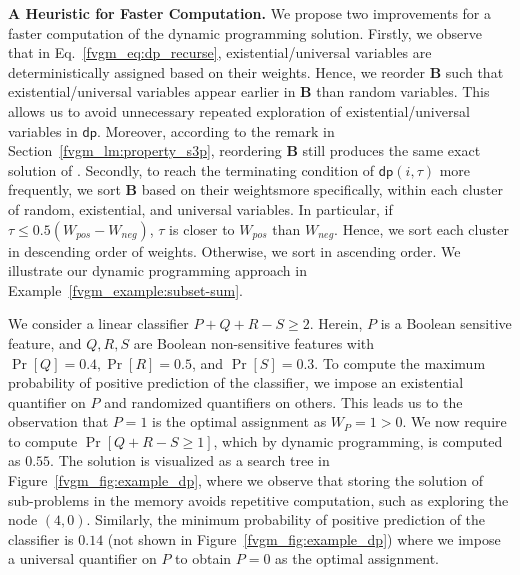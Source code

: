 \textbf{A Heuristic for Faster Computation.} 
We propose two improvements for a faster computation of the dynamic programming solution. Firstly, we observe that in Eq.~\eqref{fvgm_eq:dp_recurse}, existential/universal variables are deterministically  assigned based on their weights. Hence, we reorder $ \mathbf{B} $ such that existential/universal variables appear earlier in $ \mathbf{B} $ than random variables. This allows us to avoid unnecessary repeated exploration of existential/universal variables in $ \mathsf{dp} $. Moreover, according to the remark in Section~\ref{fvgm_lm:property_s3p}, reordering $ \mathbf{B} $ still produces the same exact solution of {\stochastic}. Secondly, to reach the terminating condition of $ \mathsf{dp}(i, \tau) $ more frequently, we sort $ \mathbf{B} $ based on their weights\textemdash more specifically, within each cluster of random, existential, and universal variables. In particular, if $ \tau \le 0.5(W_{pos} - W_{neg}) $, $ \tau $ is closer to $ W_{pos} $ than $ W_{neg} $. Hence, we sort each cluster in descending order of weights. Otherwise,  we sort in ascending order. We illustrate our dynamic programming approach in Example~\ref{fvgm_example:subset-sum}.
	
\begin{example}\label{fvgm_example:subset-sum}
\normalfont
We consider a linear classifier $ P + Q + R - S \ge 2$. Herein, $ P $ is a Boolean sensitive feature, and $ Q, R, S $ are Boolean non-sensitive features with $ \Pr[Q] = 0.4,  \Pr[R] = 0.5 $, and $ \Pr[S] = 0.3 $. To compute the maximum probability of positive prediction of the classifier,  we impose an existential quantifier on $P$ and randomized quantifiers on others. This leads us to the observation that $ P = 1 $ is the optimal assignment as $ W_P = 1 > 0 $. We now require to compute $ \Pr[Q + R - S \ge 1] $, which by dynamic programming, is computed as $ 0.55 $. The solution is visualized as a search tree in Figure~\ref{fvgm_fig:example_dp}, where we observe that storing the solution of sub-problems in the memory avoids repetitive computation, such as exploring the node $ (4,0) $. Similarly, the minimum probability of positive prediction  of the classifier is $ 0.14 $ (not shown in Figure~\ref{fvgm_fig:example_dp}) where we impose a universal quantifier on $P$ to obtain $ P = 0 $ as the optimal assignment. 
\end{example}

	
	